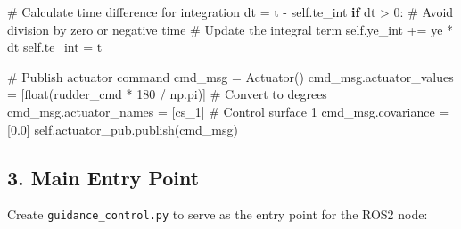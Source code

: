 \documentclass[
  letterpaper,
  DIV=11,
  numbers=noendperiod]{scrreprt}
\newenvironment{Shaded}{\begin{snugshade}}{\end{snugshade}}
\newcommand{\BuiltInTok}[1]{\textcolor[rgb]{0.00,0.23,0.31}{#1}}
\newcommand{\CommentTok}[1]{\textcolor[rgb]{0.37,0.37,0.37}{#1}}
\newcommand{\ControlFlowTok}[1]{\textcolor[rgb]{0.00,0.23,0.31}{\textbf{#1}}}
\newcommand{\DecValTok}[1]{\textcolor[rgb]{0.68,0.00,0.00}{#1}}
\newcommand{\FloatTok}[1]{\textcolor[rgb]{0.68,0.00,0.00}{#1}}
\newcommand{\NormalTok}[1]{\textcolor[rgb]{0.00,0.23,0.31}{#1}}
\newcommand{\OperatorTok}[1]{\textcolor[rgb]{0.37,0.37,0.37}{#1}}
\newcommand{\StringTok}[1]{\textcolor[rgb]{0.13,0.47,0.30}{#1}}
\newcommand{\VariableTok}[1]{\textcolor[rgb]{0.07,0.07,0.07}{#1}}
\begin{document}
\begin{Shaded}
\begin{Highlighting}[]
        \CommentTok{\# Calculate time difference for integration}
\NormalTok{        dt }\OperatorTok{=}\NormalTok{ t }\OperatorTok{{-}} \VariableTok{self}\NormalTok{.te\_int}
        \ControlFlowTok{if}\NormalTok{ dt }\OperatorTok{\textgreater{}} \DecValTok{0}\NormalTok{:  }\CommentTok{\# Avoid division by zero or negative time}
            \CommentTok{\# Update the integral term}
            \VariableTok{self}\NormalTok{.ye\_int }\OperatorTok{+=}\NormalTok{ ye }\OperatorTok{*}\NormalTok{ dt}
            \VariableTok{self}\NormalTok{.te\_int }\OperatorTok{=}\NormalTok{ t}
        
        \CommentTok{\# Publish actuator command}
\NormalTok{        cmd\_msg }\OperatorTok{=}\NormalTok{ Actuator()}
\NormalTok{        cmd\_msg.actuator\_values }\OperatorTok{=}\NormalTok{ [}\BuiltInTok{float}\NormalTok{(rudder\_cmd }\OperatorTok{*} \DecValTok{180} \OperatorTok{/}\NormalTok{ np.pi)]  }\CommentTok{\# Convert to degrees}
\NormalTok{        cmd\_msg.actuator\_names }\OperatorTok{=}\NormalTok{ [}\StringTok{\textquotesingle{}cs\_1\textquotesingle{}}\NormalTok{]  }\CommentTok{\# Control surface 1}
\NormalTok{        cmd\_msg.covariance }\OperatorTok{=}\NormalTok{ [}\FloatTok{0.0}\NormalTok{]}
        \VariableTok{self}\NormalTok{.actuator\_pub.publish(cmd\_msg)}
\end{Highlighting}
\end{Shaded}

\subsection*{3. Main Entry Point}\label{main-entry-point}

Create \texttt{guidance\_control.py} to serve as the entry point for the
ROS2 node:
\end{document}
